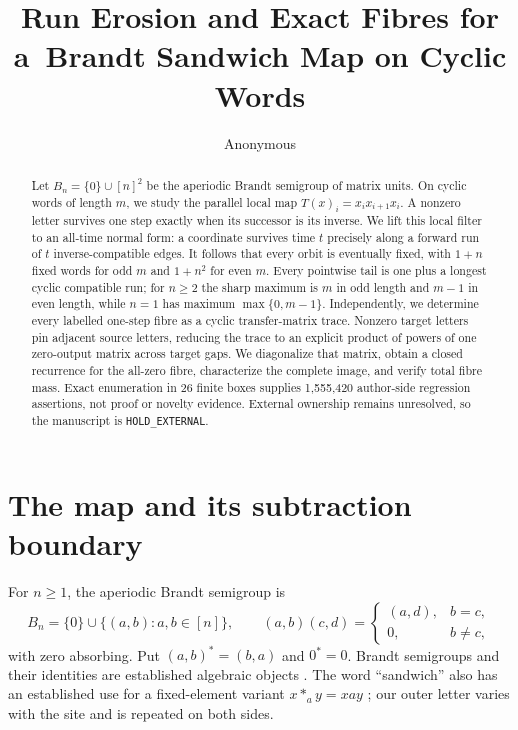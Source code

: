 \documentclass[a4paper,10pt]{amsart}
\title[Brandt sandwich erosion]{Run Erosion and Exact Fibres for a\
Brandt Sandwich Map on Cyclic Words}
\author{Anonymous}
\date{}
\theoremstyle{remark}
\newcommand{\Bn}{B_n}
\begin{document}
\begin{abstract}
Let $B_n=\{0\}\cup[n]^2$ be the aperiodic Brandt semigroup of matrix
units.  On cyclic words of length $m$, we study the parallel local map
$T(x)_i=x_i x_{i+1}x_i$.  A nonzero letter survives one step exactly when
its successor is its inverse.  We lift this local filter to an all-time
normal form: a coordinate survives time $t$ precisely along a forward run of
$t$ inverse-compatible edges.  It follows that every orbit is eventually
fixed, with $1+n$ fixed words for odd $m$ and $1+n^2$ for even $m$.  Every
pointwise tail is one plus a longest cyclic compatible run; for $n\geq2$ the
sharp maximum is $m$ in odd length and $m-1$ in even length, while $n=1$
has maximum $\max\{0,m-1\}$.  Independently, we determine every labelled
one-step fibre as a cyclic transfer-matrix trace.  Nonzero target letters pin
adjacent source letters, reducing the trace to an explicit product of powers
of one zero-output matrix across target gaps.  We diagonalize that matrix,
obtain a closed recurrence for the all-zero fibre, characterize the complete
image, and verify total fibre mass.  Exact enumeration in 26 finite boxes
supplies 1,555,420 author-side regression assertions, not proof or novelty
evidence.  External ownership remains unresolved, so the manuscript is
\texttt{HOLD\_EXTERNAL}.
\end{abstract}

\maketitle

\section{The map and its subtraction boundary}

For $n\geq1$, the aperiodic Brandt semigroup is
\begin{equation}\label{eq:brandt}
 \Bn=\{0\}\cup\{(a,b):a,b\in[n]\},\qquad
 (a,b)(c,d)=\begin{cases}(a,d),&b=c,\\0,&b\ne c,\end{cases}
\end{equation}
with zero absorbing.  Put $(a,b)^*=(b,a)$ and $0^*=0$.  Brandt semigroups
and their identities are established algebraic objects
\cite{Volkov2019}.  The word ``sandwich'' also has an established use for a
fixed-element variant $x*_a y=xay$ \cite{DesiaterykGanyushkin2024}; our
outer letter varies with the site and is repeated on both sides.
\end{document}
